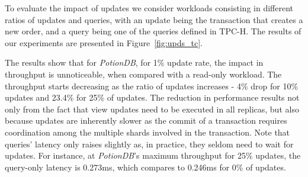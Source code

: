 \documentclass[sigplan,twocolumn,review,anonymous]{acmart}
\begin{document}
To evaluate the impact of updates we consider workloads consisting in different ratios of updates and queries, with
an update being the transaction that creates a new order, and a query being one of the queries defined in
TPC-H.
The results of our experiments
are presented in Figure~\ref{fig:upds_tc}.

The results show that for \textit{PotionDB}, for 1\% update rate, the impact in throughput is unnoticeable, when compared with a read-only workload.
The throughput starts decreasing as the ratio of updates increases - 4\% drop for 10\% updates and 23.4\% for 25\% of updates.
The reduction in performance results not only from the fact that view updates need to be executed in all replicas, but also because 
updates are inherently slower as the commit of a transaction requires coordination among the multiple shards involved in the transaction. 
Note that queries' latency only raises slightly as, in practice, they seldom need to wait for updates.
For instance, at \textit{PotionDB}'s maximum throughput for 25\% updates, the query-only latency is 0.273ms, which compares to 0.246ms for 0\% of updates.

\end{document}
